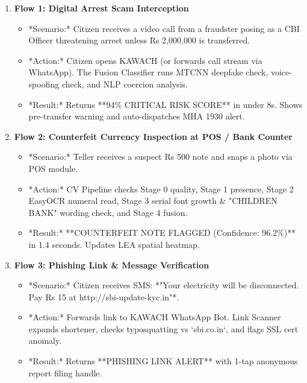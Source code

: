 \documentclass[10pt]{article}
\newcommand{\subhead}[1]{\vspace{6pt}\noindent{\color{navy}\bfseries\large #1}\vspace{3pt}\par}
\begin{document}
\subhead{4.1 End-to-End Operational Flows}
\small
\begin{enumerate}[leftmargin=14pt, itemsep=4pt]
\item \textbf{Flow 1: Digital Arrest Scam Interception}
  \begin{itemize}[leftmargin=10pt,topsep=1pt,itemsep=1pt]
  \item *Scenario:* Citizen receives a video call from a fraudster posing as a CBI Officer threatening arrest unless Rs 2,000,000 is transferred.
  \item *Action:* Citizen opens KAWACH (or forwards call stream via WhatsApp). The Fusion Classifier runs MTCNN deepfake check, voice-spoofing check, and NLP coercion analysis.
  \item *Result:* Returns **94\% CRITICAL RISK SCORE** in under 8s. Shows pre-transfer warning and auto-dispatches MHA 1930 alert.
  \end{itemize}

\item \textbf{Flow 2: Counterfeit Currency Inspection at POS / Bank Counter}
  \begin{itemize}[leftmargin=10pt,topsep=1pt,itemsep=1pt]
  \item *Scenario:* Teller receives a suspect Rs 500 note and snaps a photo via POS module.
  \item *Action:* CV Pipeline checks Stage 0 quality, Stage 1 presence, Stage 2 EasyOCR numeral read, Stage 3 serial font growth & "CHILDREN BANK" wording check, and Stage 4 fusion.
  \item *Result:* **COUNTERFEIT NOTE FLAGGED (Confidence: 96.2\%)** in 1.4 seconds. Updates LEA spatial heatmap.
  \end{itemize}

\item \textbf{Flow 3: Phishing Link \& Message Verification}
  \begin{itemize}[leftmargin=10pt,topsep=1pt,itemsep=1pt]
  \item *Scenario:* Citizen receives SMS: *"Your electricity will be disconnected. Pay Rs 15 at http://sbi-update-kyc.in"*.
  \item *Action:* Forwards link to KAWACH WhatsApp Bot. Link Scanner expands shortener, checks typosquatting vs `sbi.co.in`, and flags SSL cert anomaly.
  \item *Result:* Returns **PHISHING LINK ALERT** with 1-tap anonymous report filing handle.
  \end{itemize}


\end{enumerate}
\end{document}
